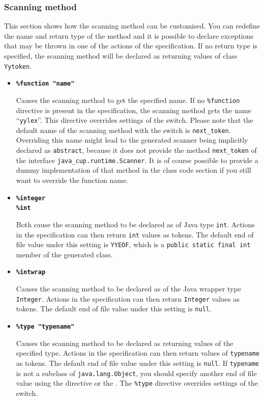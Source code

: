 \documentclass[11pt]{scrartcl}
\newcommand{\bl}{\latex{\symbol{123}}\html{\{}}
\newcommand{\br}{\latex{\symbol{125}}\html{\}}}
\begin{document}
\subsubsection{Scanning method\label{ScanningMethod}}
This section shows how the scanning method can be customised. You can redefine
the name and return type of the method and it is possible to declare
exceptions that may be thrown in one of the actions of the specification.
If no return type is specified, the scanning method will be declared as
returning values of class \texttt{Yytoken}.
\begin{itemize}
\item
{\bf \texttt{\%function "name"}}

Causes the scanning method to get the specified name. If no \texttt{\%function}
directive is present in the specification, the scanning method gets the
name ``\texttt{yylex}''. This directive overrides settings of the 
\texttt{} switch. Please note that the default name
of the scanning method with the \texttt{} switch is
\texttt{next\_token}. Overriding this name might lead to the generated scanner
being implicitly declared as \texttt{abstract}, because it does not provide
the method \texttt{next\_token} of the interface \texttt{java\_cup.runtime.Scanner}.
It is of course possible to provide a dummy implementation of that method
in the class code section if you still want to override the function name.
 
\item
{\bf \texttt{\%integer}}\\
{\bf \texttt{\%int}}

Both cause the scanning method to be declared as of Java type \texttt{int}.
Actions in the specification can then return \texttt{int} values as tokens.
The default end of file value under this setting is \texttt{YYEOF}, which is a \texttt{public
static final int} member of the generated class.
 
\item
{\bf \texttt{\%intwrap}}

Causes the scanning method to be declared as of the Java wrapper type
\texttt{Integer}. Actions in the specification can then return \texttt{Integer}
values as tokens. The default end of file value under this setting is \texttt{null}.
 
\item
{\bf \texttt{\%type "typename"}}

Causes the scanning method to be declared as returning values of the specified type.
Actions in the specification can then return values of \texttt{typename}
as tokens. The default end of file value under this setting is \texttt{null}.
If \texttt{typename} is not a subclass of \texttt{java.lang.Object},
you should specify another end of file value using the
\htmlref{\texttt{\%eofval\bl} \texttt{...} \texttt{\%eofval\br}}{eofval}
directive or the . 
The \texttt{\%type} directive overrides settings of the 
\texttt{} switch.
 

\end{itemize}
\end{document}
